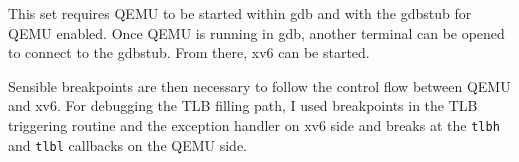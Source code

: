 This set requires QEMU to be started within gdb and with the gdbstub for QEMU enabled. Once QEMU is running in gdb, another terminal can be opened to connect to the gdbstub. From there, xv6 can be started.

Sensible breakpoints are then necessary to follow the control flow between QEMU and xv6. For debugging the TLB filling path, I used breakpoints in the TLB triggering routine and the exception handler on xv6 side and breaks at the \texttt{tlbh} and \texttt{tlbl} callbacks on the QEMU side.






